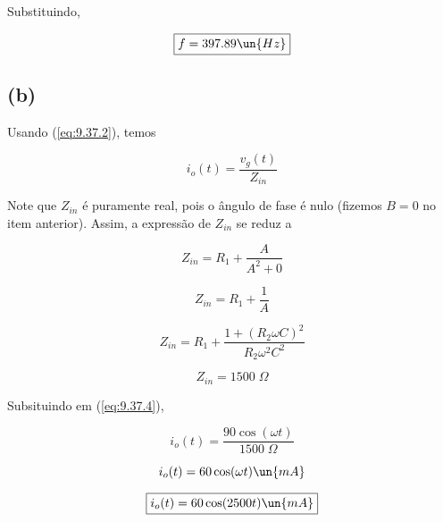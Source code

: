 Substituindo,

\[ \boxed{f = 397.89 \un{Hz}}  \]

\subsection*{(b)}

Usando (\ref{eq:9.37.2}), temos

\begin{equation}\label{eq:9.37.4}
    i_o(t) = \frac{v_g(t)}{Z_{in}}
\end{equation}

Note que $Z_{in}$ é puramente real, pois o ângulo de fase é nulo (fizemos $B = 0$ no item anterior). Assim, a expressão de 
$Z_{in}$ se reduz a 

\[ Z_{in} = R_1 + \frac{A}{A^2 + 0} \]

\[ Z_{in} = R_1 + \frac{1}{A} \]

\[ Z_{in} = R_1 + \frac{1 + (R_2\omega C)^2}{R_2\omega^2C^2} \]

\[ Z_{in} = 1500 \; \Omega \]

Subsituindo em (\ref{eq:9.37.4}),

\[ i_o(t) = \frac{90\cos(\omega t)}{1500 \; \Omega} \]

\[ i_o(t) = 60\cos(\omega t) \un{mA} \]

\[ \boxed{i_o(t) = 60\cos(2500 t) \un{mA}}  \]












